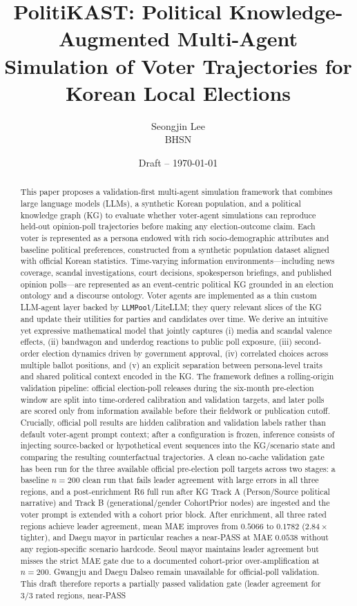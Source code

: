 \documentclass[11pt]{article}
\title{PolitiKAST: Political Knowledge-Augmented Multi-Agent Simulation of Voter Trajectories for Korean Local Elections}
\author{Seongjin Lee\\BHSN}
\date{Draft -- \today}
\begin{document}
\maketitle

\begin{abstract}
This paper proposes a validation-first multi-agent simulation framework that combines large language models (LLMs), a synthetic Korean population, and a political knowledge graph (KG) to evaluate whether voter-agent simulations can reproduce held-out opinion-poll trajectories before making any election-outcome claim. Each voter is represented as a persona endowed with rich socio-demographic attributes and baseline political preferences, constructed from a synthetic population dataset aligned with official Korean statistics. Time-varying information environments---including news coverage, scandal investigations, court decisions, spokesperson briefings, and published opinion polls---are represented as an event-centric political KG grounded in an election ontology and a discourse ontology. Voter agents are implemented as a thin custom LLM-agent layer backed by \texttt{LLMPool}/LiteLLM; they query relevant slices of the KG and update their utilities for parties and candidates over time. We derive an intuitive yet expressive mathematical model that jointly captures (i) media and scandal valence effects, (ii) bandwagon and underdog reactions to public poll exposure, (iii) second-order election dynamics driven by government approval, (iv) correlated choices across multiple ballot positions, and (v) an explicit separation between persona-level traits and shared political context encoded in the KG. The framework defines a rolling-origin validation pipeline: official election-poll releases during the six-month pre-election window are split into time-ordered calibration and validation targets, and later polls are scored only from information available before their fieldwork or publication cutoff. Crucially, official poll results are hidden calibration and validation labels rather than default voter-agent prompt context; after a configuration is frozen, inference consists of injecting source-backed or hypothetical event sequences into the KG/scenario state and comparing the resulting counterfactual trajectories. A clean no-cache validation gate has been run for the three available official pre-election poll targets across two stages: a baseline $n{=}200$ clean run that fails leader agreement with large errors in all three regions, and a post-enrichment R6 full run after KG Track A (Person/Source political narrative) and Track B (generational/gender CohortPrior nodes) are ingested and the voter prompt is extended with a cohort prior block. After enrichment, all three rated regions achieve leader agreement, mean MAE improves from $0.5066$ to $0.1782$ ($2.84\times$ tighter), and Daegu mayor in particular reaches a near-PASS at MAE $0.0538$ without any region-specific scenario hardcode. Seoul mayor maintains leader agreement but misses the strict MAE gate due to a documented cohort-prior over-amplification at $n{=}200$. Gwangju and Daegu Dalseo remain unavailable for official-poll validation. This draft therefore reports a partially passed validation gate (leader agreement for $3/3$ rated regions, near-PASS 
\end{abstract}
\end{document}
